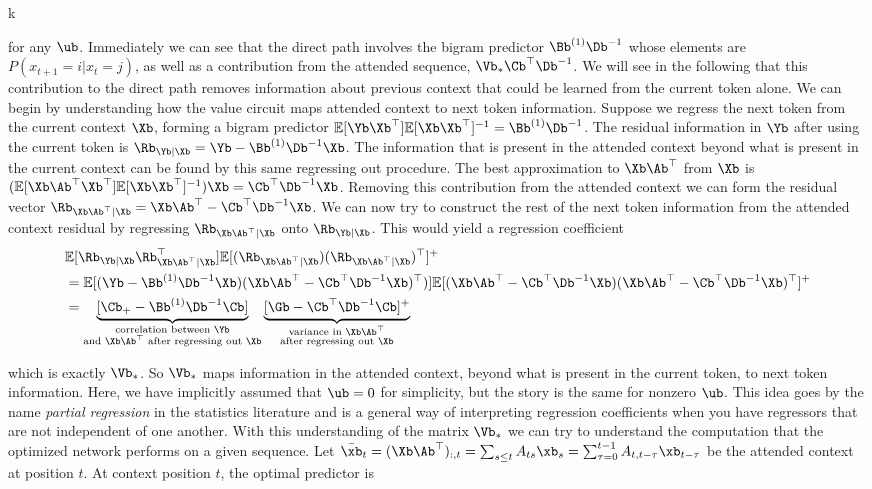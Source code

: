 k\documentclass{article}
\begin{document}
for any $\ub$. Immediately we can see that the direct path involves the bigram predictor $\Bb^{(1)}\Db^{-1}$ whose elements are $P(x_{t+1} = i | x_t = j)$, as well as a contribution from the attended sequence, $\Vb_* \Cb^\top \Db^{-1}$. We will see in the following that this contribution to the direct path removes information about previous context that could be learned from the current token alone. We can begin by understanding how the value circuit maps attended context to next token information. Suppose we regress the next token from the current context $\Xb$, forming a bigram predictor $\mathbb{E}[\Yb\Xb^\top]\mathbb{E}[\Xb\Xb^\top]^{-1} = \Bb^{(1)}\Db^{-1}$. The residual information in $\Yb$ after using the current token is $\Rb_{\Yb|\Xb} = \Yb - \Bb^{(1)}\Db^{-1}\Xb$. The information that is present in the attended context beyond what is present in the current context can be found by this same regressing out procedure. The best approximation to $\Xb \Ab^\top$ from $\Xb$ is $(\mathbb{E}[\Xb\Ab^\top\Xb^\top]\mathbb{E}[\Xb\Xb^\top]^{-1})\Xb = \Cb^\top \Db^{-1}\Xb$. Removing this contribution from the attended context we can form the residual vector $\Rb_{\Xb \Ab^\top | \Xb} = \Xb\Ab^\top - \Cb^\top\Db^{-1}\Xb$. We can now try to construct the rest of the next token information from the attended context residual by regressing $\Rb_{\Xb \Ab^\top | \Xb}$ onto $\Rb_{\Yb|\Xb}$. This would yield a regression coefficient 
\begin{align}
    &\mathbb{E}[\Rb_{\Yb|\Xb}\Rb_{\Xb \Ab^\top | \Xb}^\top]\mathbb{E}[(\Rb_{\Xb \Ab^\top | \Xb})(\Rb_{\Xb \Ab^\top | \Xb})^\top]^{+}\\
    &= \mathbb{E}[(\Yb - \Bb^{(1)}\Db^{-1}\Xb)(\Xb\Ab^\top - \Cb^\top\Db^{-1}\Xb)^\top)]\mathbb{E}[(\Xb\Ab^\top - \Cb^\top\Db^{-1}\Xb)(\Xb\Ab^\top - \Cb^\top\Db^{-1}\Xb)^\top]^{+} \\
    &= \underbrace{[\Cb_+ - \Bb^{(1)}\Db^{-1}\Cb]}_{\substack{\textrm{correlation between $\Yb$} \\ \textrm{and $\Xb\Ab^\top$ after regressing out $\Xb$}}}\underbrace{[\Gb - \Cb^\top \Db^{-1}\Cb]^{+}}_{\substack{\textrm{variance in $\Xb\Ab^\top$} \\ \textrm{after regressing out $\Xb$}}}
\end{align}

which is exactly $\Vb_*$. So $\Vb_*$ maps information in the attended context, beyond what is present in the current token, to next token information. Here, we have implicitly assumed that $\ub = 0$ for simplicity, but the story is the same for nonzero $\ub$. This idea goes by the name \textit{partial regression} in the statistics literature and is a general way of interpreting regression coefficients when you have regressors that are not independent of one another. 
\newline
\newline
\newline
With this understanding of the matrix $\Vb_*$ we can try to understand the computation that the optimized network performs on a given sequence. Let $\bar{\xb}_t = (\Xb \Ab^\top)_{:,t} = \sum_{s\le t} A_{ts}\xb_s = \sum_{\tau=0}^{t-1} A_{t, t-\tau}\xb_{t-\tau}$ be the attended context at position $t$. At context position $t$, the optimal predictor is 
\end{document}
